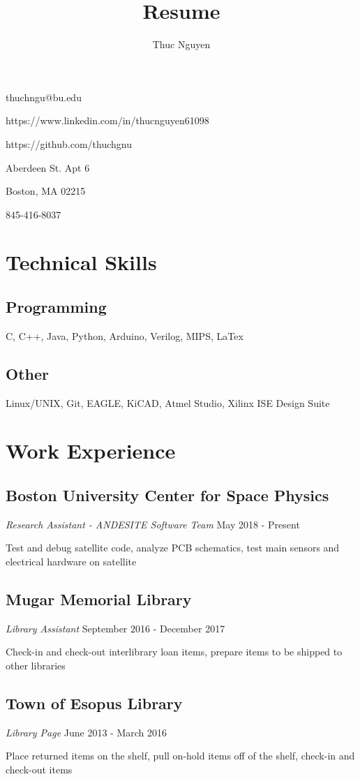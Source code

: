 \documentclass{article}
\makeatletter
\renewcommand{\maketitle}
{\begin{center}
{\huge\bfseries\theauthor}
\vspace{.5em}

thuchngu@bu.edu

https://www.linkedin.com/in/thucnguyen61098

https://github.com/thuchgnu

\end{center}}
\makeatother
\begin{document}
\title{Resume}
\author{Thuc Nguyen}
\maketitle
\vspace{-.5em}
{ Aberdeen St. Apt 6

Boston, MA 02215

845-416-8037

}
\vspace{-.65em}
\section{Technical Skills}
\subsection{Programming}
C, C++, Java, Python, Arduino, Verilog, MIPS, LaTex
\subsection{Other}
Linux/UNIX, Git, EAGLE, KiCAD, Atmel Studio, Xilinx ISE Design Suite

\section{Work Experience}
\subsection{Boston University Center for Space Physics}  \textit{Research Assistant - ANDESITE Software Team}
May 2018 - Present

Test and debug satellite code, analyze PCB schematics, test main sensors and electrical hardware on satellite
\subsection{Mugar Memorial Library} \textit{Library Assistant}
September 2016 - December 2017

Check-in and check-out interlibrary loan items, prepare items to be shipped to other libraries
\subsection{Town of Esopus Library} \textit{Library Page}
June 2013 - March 2016

Place returned items on the shelf, pull on-hold items off of the shelf, check-in and check-out items
\end{document}
